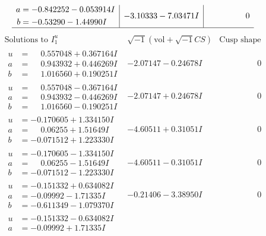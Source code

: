 \documentclass[1p]{elsarticle_modified}
\theoremstyle{definition}
\newcommand{\I}{\sqrt{-1}}
\begin{document}
$$\begin{array}{c|c|c}
\begin{aligned}
a &= -0.842252 - 0.053914 I \\
b &= -0.53290 - 1.44990 I\end{aligned}
 & -3.10333 - 7.03471 I & \phantom{-0.000000 } 0\\
 \hline 
 \end{array}$$\newpage$$\begin{array}{c|c|c}  
\text{Solutions to }I^u_{1}& \I (\text{vol} + \sqrt{-1}CS) & \text{Cusp shape}\\
 \hline 
\begin{aligned}
u &= \phantom{-}0.557048 + 0.367164 I \\
a &= \phantom{-}0.943932 + 0.446269 I \\
b &= \phantom{-}1.016560 + 0.190251 I\end{aligned}
 & -2.07147 - 0.24678 I & \phantom{-0.000000 } 0 \\ \hline\begin{aligned}
u &= \phantom{-}0.557048 - 0.367164 I \\
a &= \phantom{-}0.943932 - 0.446269 I \\
b &= \phantom{-}1.016560 - 0.190251 I\end{aligned}
 & -2.07147 + 0.24678 I & \phantom{-0.000000 } 0 \\ \hline\begin{aligned}
u &= -0.170605 + 1.334150 I \\
a &= \phantom{-}0.06255 + 1.51649 I \\
b &= -0.071512 + 1.223330 I\end{aligned}
 & -4.60511 + 0.31051 I & \phantom{-0.000000 } 0 \\ \hline\begin{aligned}
u &= -0.170605 - 1.334150 I \\
a &= \phantom{-}0.06255 - 1.51649 I \\
b &= -0.071512 - 1.223330 I\end{aligned}
 & -4.60511 - 0.31051 I & \phantom{-0.000000 } 0 \\ \hline\begin{aligned}
u &= -0.151332 + 0.634082 I \\
a &= -0.09992 - 1.71335 I \\
b &= -0.611349 - 1.079370 I\end{aligned}
 & -0.21406 - 3.38950 I & \phantom{-0.000000 } 0 \\ \hline\begin{aligned}
u &= -0.151332 - 0.634082 I \\
a &= -0.09992 + 1.71335 I \\

\end{aligned}
\end{array}$$
\end{document}
